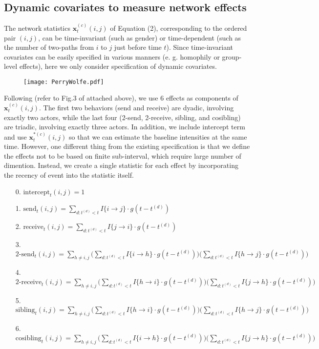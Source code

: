 \documentclass[a4paper]{article}
\begin{document}
\subsection{Dynamic covariates to measure network effects}
The network statistics $\boldsymbol{x}^{(c)}_t(i, j)$ of Equation (2), corresponding to the ordered pair $(i, j)$, can be time-invariant (such as gender) or time-dependent (such as the number of two-paths from $i$ to $j$ just before time $t$). Since time-invariant covariates can be easily specified in various manners (e. g. homophily or group-level effects), here we only consider specification of dynamic covariates.
\begin{figure}[ht]
	\centering
	\texttt{[image: PerryWolfe.pdf]} 
	\label{fig:PerryWolfeplot}
\end{figure}
\newline Following \cite{PerryWolfe2012} (refer to Fig.3 of \cite{PerryWolfe2012} attached above), we use 6 effects as components of $\boldsymbol{x}^{(c)}_t(i, j)$. The first two behaviors (send and receive) are dyadic, involving exactly two actors,
while the last four (2-send, 2-receive, sibling, and cosibling) are triadic, involving exactly three actors. In addition, we include intercept term and use $\boldsymbol{x}^{*(c)}_t(i, j)$ so that we can estimate the baseline intensities at the same time. However, one different thing from the existing specification is that we define the effects not to be based on finite sub-interval, which require large number of dimention. Instead, we create a single statistic for each effect by incorporating the recency of event into the statistic itself. 
\begin{itemize}[leftmargin=*,rightmargin=-1cm ]
\item [0.] $\mbox{intercept}_t(i, j) = 1$
\item [1.]  $\mbox{send}_t(i, j)=\sum\limits_{d: t^{(d)}<t} I\{i\rightarrow j\}\cdot g(t-t^{(d)})$
\item [2.] $\mbox{receive}_t(i, j)=\sum\limits_{d: t^{(d)}<t} I\{j\rightarrow i\}\cdot g(t-t^{(d)})$
\item [3.] $\mbox{2-send}_t(i, j)=\sum\limits_{h \neq i, j}\Big(\sum\limits_{d: t^{(d)}<t}  I\{i\rightarrow h\}\cdot g(t-t^{(d)})\Big)\Big(\sum\limits_{d: t^{(d)}<t} I\{h\rightarrow j\}\cdot g(t-t^{(d)})\Big)$
\item [4.]  $\mbox{2-receive}_t(i, j)=\sum\limits_{h \neq i, j}\Big(\sum\limits_{d: t^{(d)}<t} I\{h\rightarrow i\}\cdot g(t-t^{(d)})\Big)\Big(\sum\limits_{d: t^{(d)}<t} I\{j\rightarrow h\}\cdot g(t-t^{(d)})\Big)$
\item [5.] $\mbox{sibling}_t(i, j)=\sum\limits_{h \neq i, j}\Big(\sum\limits_{d: t^{(d)}<t} I\{h\rightarrow i\}\cdot g(t-t^{(d)})\Big)\Big(\sum\limits_{d: t^{(d)}<t} I\{h\rightarrow j\}\cdot g(t-t^{(d)})\Big)$
\item [6.] $\mbox{cosibling}_t(i, j)=\sum\limits_{h \neq i, j}\Big(\sum\limits_{d: t^{(d)}<t} I\{i\rightarrow h\}\cdot g(t-t^{(d)})\Big)\Big(\sum\limits_{d: t^{(d)}<t} I\{j\rightarrow h\}\cdot g(t-t^{(d)})\Big)$
\end{itemize}
\end{document}

